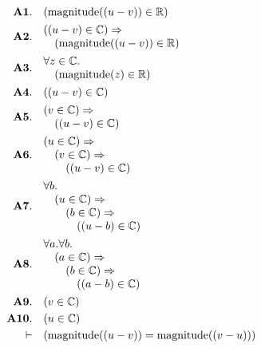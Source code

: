 \documentclass[11pt]{article}
\theoremstyle{plain}
\begin{document}
\begin{align*}
  \mathbf{A1.}\quad & (\operatorname{magnitude}((u - v)) \in \mathbb{R}) \\
  \mathbf{A2.}\quad & \begin{array}{@{}l@{}} ((u - v) \in \mathbb{C}) \Rightarrow  \\ \quad (\operatorname{magnitude}((u - v)) \in \mathbb{R}) \end{array} \\
  \mathbf{A3.}\quad & \begin{array}{@{}l@{}} \forall z \in \mathbb{C}. \\ \quad (\operatorname{magnitude}(z) \in \mathbb{R}) \end{array} \\
  \mathbf{A4.}\quad & ((u - v) \in \mathbb{C}) \\
  \mathbf{A5.}\quad & \begin{array}{@{}l@{}} (v \in \mathbb{C}) \Rightarrow  \\ \quad ((u - v) \in \mathbb{C}) \end{array} \\
  \mathbf{A6.}\quad & \begin{array}{@{}l@{}} (u \in \mathbb{C}) \Rightarrow  \\ \quad (v \in \mathbb{C}) \Rightarrow  \\ \quad \quad ((u - v) \in \mathbb{C}) \end{array} \\
  \mathbf{A7.}\quad & \begin{array}{@{}l@{}} \forall b. \\ \quad (u \in \mathbb{C}) \Rightarrow  \\ \quad \quad (b \in \mathbb{C}) \Rightarrow  \\ \quad \quad \quad ((u - b) \in \mathbb{C}) \end{array} \\
  \mathbf{A8.}\quad & \begin{array}{@{}l@{}} \forall a. \forall b. \\ \quad (a \in \mathbb{C}) \Rightarrow  \\ \quad \quad (b \in \mathbb{C}) \Rightarrow  \\ \quad \quad \quad ((a - b) \in \mathbb{C}) \end{array} \\
  \mathbf{A9.}\quad & (v \in \mathbb{C}) \\
  \mathbf{A10.}\quad & (u \in \mathbb{C}) \\
  \vdash\quad & (\operatorname{magnitude}((u - v)) = \operatorname{magnitude}((v - u)))
\end{align*}
\end{document}
